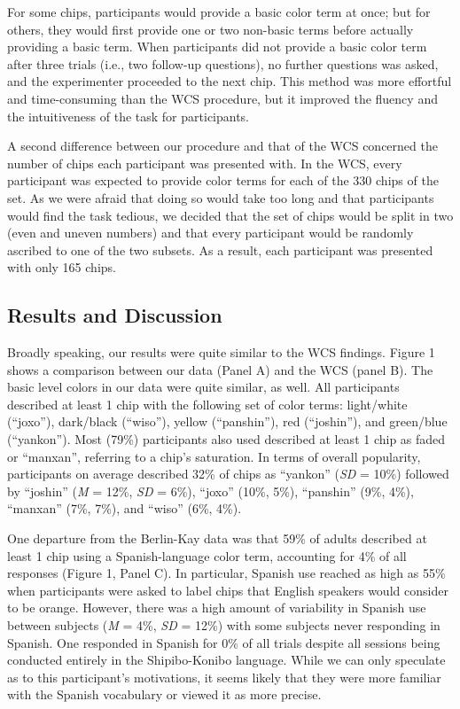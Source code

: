 \documentclass[,man,floatsintext]{apa6}
\theoremstyle{definition}
\theoremstyle{definition}
\theoremstyle{definition}
\theoremstyle{remark}
\begin{document}
For some chips, participants would provide a basic color term at once;
but for others, they would first provide one or two non-basic terms
before actually providing a basic term. When participants did not
provide a basic color term after three trials (i.e., two follow-up
questions), no further questions was asked, and the experimenter
proceeded to the next chip. This method was more effortful and
time-consuming than the WCS procedure, but it improved the fluency and
the intuitiveness of the task for participants.

A second difference between our procedure and that of the WCS concerned
the number of chips each participant was presented with. In the WCS,
every participant was expected to provide color terms for each of the
330 chips of the set. As we were afraid that doing so would take too
long and that participants would find the task tedious, we decided that
the set of chips would be split in two (even and uneven numbers) and
that every participant would be randomly ascribed to one of the two
subsets. As a result, each participant was presented with only 165
chips.

\subsection{Results and Discussion}\label{results-and-discussion}

Broadly speaking, our results were quite similar to the WCS findings.
Figure 1 shows a comparison between our data (Panel A) and the WCS
(panel B). The basic level colors in our data were quite similar, as
well. All participants described at least 1 chip with the following set
of color terms: light/white (\enquote{joxo}), dark/black
(\enquote{wiso}), yellow (\enquote{panshin}), red (\enquote{joshin}),
and green/blue (\enquote{yankon}). Most (79\%) participants also used
described at least 1 chip as faded or \enquote{manxan}, referring to a
chip's saturation. In terms of overall popularity, participants on
average described 32\% of chips as \enquote{yankon} (\emph{SD} = 10\%)
followed by \enquote{joshin} (\emph{M} = 12\%, \emph{SD} = 6\%),
\enquote{joxo} (10\%, 5\%), \enquote{panshin} (9\%, 4\%),
\enquote{manxan} (7\%, 7\%), and \enquote{wiso} (6\%, 4\%).

One departure from the Berlin-Kay data was that 59\% of adults described
at least 1 chip using a Spanish-language color term, accounting for 4\%
of all responses (Figure 1, Panel C). In particular, Spanish use reached
as high as 55\% when participants were asked to label chips that English
speakers would consider to be orange. However, there was a high amount
of variability in Spanish use between subjects (\emph{M} = 4\%,
\emph{SD} = 12\%) with some subjects never responding in Spanish. One
responded in Spanish for 0\% of all trials despite all sessions being
conducted entirely in the Shipibo-Konibo language. While we can only
speculate as to this participant's motivations, it seems likely that
they were more familiar with the Spanish vocabulary or viewed it as more
precise.
\end{document}
